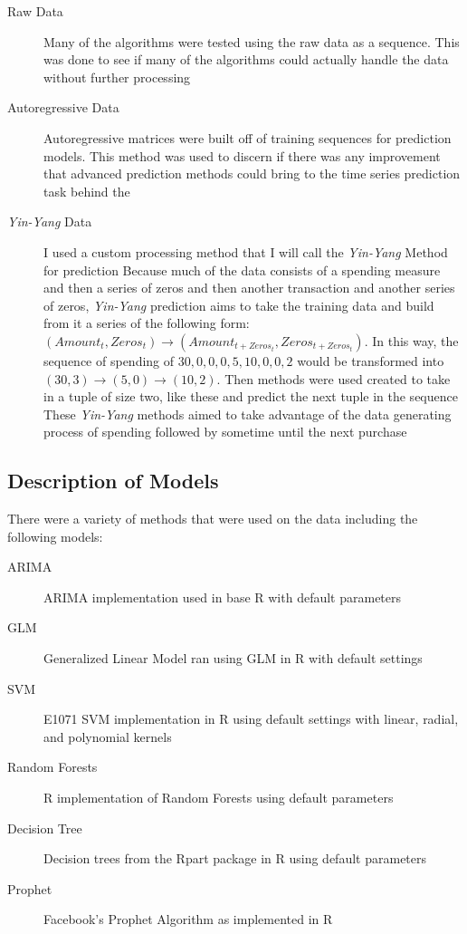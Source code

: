 \documentclass[11pt,a4paper]{article}
\begin{document}
\newcommand{\yinyang}{\textit{Yin-Yang}\xspace}

\begin{description}
	\item[Raw Data] Many of the algorithms were tested using the raw data as a sequence. This was done to see if many of the algorithms could actually handle the data without further processing
	\item[Autoregressive Data] Autoregressive matrices were built off of training sequences for prediction models. This method was used to discern if there was any improvement that advanced prediction methods could bring to the time series prediction task behind the \preprob
	\item[\yinyang Data] I used a custom processing method that I will call the \yinyang Method for prediction Because much of the data consists of a spending measure and then a series of zeros and then another transaction and another series of zeros, \yinyang prediction aims to take the training data and build from it a series of the following form: $(Amount_t, Zeros_t) \rightarrow (Amount_{t + Zeros_t}, Zeros_{t + Zeros_t})$. In this way, the sequence of spending of $30, 0, 0 , 0 , 5, 10, 0, 0 , 2$ would be transformed into $(30, 3) \rightarrow (5,0) \rightarrow (10,2)$. Then methods were used created to take in a tuple of size two, like these and predict the next tuple in the sequence These \yinyang methods aimed to take advantage of the data generating process of spending followed by sometime until the next purchase
	
\end{description}

\subsection{Description of Models}
There were a variety of methods that were used on the data including the following models:
\begin{description}
	\item[ARIMA] ARIMA implementation used in base R with default parameters
	\item[GLM] Generalized Linear Model ran using GLM in R with default settings
	\item[SVM] E1071 SVM implementation in R using default settings with linear, radial, and polynomial kernels
	\item[Random Forests] R implementation of Random Forests using default parameters
	\item[Decision Tree] Decision trees from the Rpart package in R using default parameters
	\item[Prophet] Facebook's Prophet Algorithm \cite{Fbook} as implemented in R
\end{description}
\end{document}
